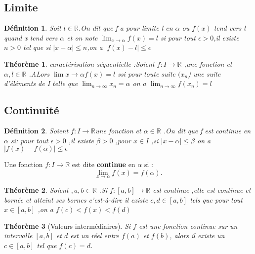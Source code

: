 \documentclass[a4paper,12pt]{article} %
\newtheorem{theoreme}{Théorème}[section]
\newtheorem{definition}{Définition}[section]
\begin{document}
      \subsection{Limite}
      \begin{definition}
      	Soit $l \in \mathbb{R}$.On dit que f a pour limite l en $\alpha$ ou $f(x) $ tend vers l quand x tend vers $\alpha$ et on note $\lim_{x \to \alpha} f(x)=l$ si pour tout $\epsilon > 0 $,il existe $n>0$ tel que si $|x-\alpha|\leq n$,on a $|f(x)-l|\leq \epsilon$
      	
      \end{definition}
      
     \begin{theoreme}
     caractérisation séquentielle :Soient $f: I \rightarrow \mathbb{R}$ ,une fonction et $\alpha ,l \in \mathbb{R}$ .ALors $\lim {x \to \alpha }f(x)=l$ ssi pour toute suite $(x_n$) une suite d'éléments de I telle que $\lim_{
      n \to \infty} x_n=\alpha $ on a $\lim_{n \to \infty } f(x_n)=l$
     
     
     \end{theoreme}
     
      \subsection{Continuité}
     \begin{definition}
     	Soient $f :I \rightarrow \mathbb{R}$une fonction et $ \alpha \in \mathbb{R}$ .On dit que f est continue en $\alpha$ si:
     	pour tout $\epsilon >0$ ,il existe $ \beta >0$ ,pour $x \in I $ ,si $|x-\alpha| \leq \beta $ on a $|f(x) -f(\alpha)| \leq \epsilon$
     	
     \end{definition}
    
     Une fonction $f : I \to \mathbb{R}$ est dite \textbf{continue} en $\alpha$ si :
    \begin{equation}
     \lim\limits_{x \to \alpha} f(x) = f(\alpha).
   \end{equation}
  	\begin{theoreme}
  	  Soient $,a ,b \in \mathbb{R}$ .Si $f:[a,b] \rightarrow \mathbb{R}$ est continue ,elle est continue et bornée et atteint ses bornes c'est-à-dire il existe $c,d \in [a,b]$ tels que pour tout $x \in [a,b]$ ,on a $f(c)<f(x)<f(d)$
  	\end{theoreme}
  	\begin{theoreme}[Valeurs intermédiaires]
		Si $f$ est une fonction continue sur un intervalle $[a, b]$ et $d$ est un réel entre $f(a)$ et $f(b)$, alors il existe un $c \in [a, b]$ tel que $f(c) = d$.
	
	\end{theoreme}
	
\end{document}
